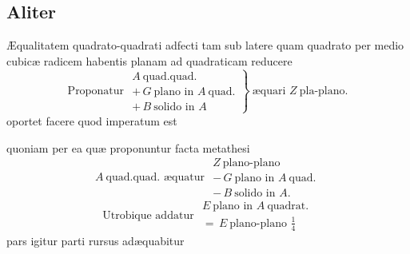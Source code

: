 \documentclass[11pt,a4paper]{article}
\begin{document}
\subsection*{Aliter}

Æqualitatem quadrato-quadrati adfecti tam sub latere quam quadrato per medio cubicæ radicem habentis planam ad quadraticam reducere
\[ \text{Proponatur } \left.\begin{array}{l} A\ \text{quad.quad.} \\ +\,G\ \text{plano in } A\ \text{quad.} \\ +\,B\ \text{solido in } A \end{array}\right\}\ \text{æquari } Z\ \text{pla-plano.} \]
oportet facere quod imperatum est


quoniam per ea quæ proponuntur facta metathesi
\[ A\ \text{quad.quad. æquatur } \begin{array}{l} Z\ \text{plano-plano} \\ -\,G\ \text{plano in } A\ \text{quad.} \\ -\,B\ \text{solido in } A. \end{array} \]
\marginal{$\mp$}
\[ \text{Utrobique addatur } \begin{array}{l} E\ \text{plano in } A\ \text{quadrat.} \\ =\,E\ \text{plano-plano } \frac{1}{4} \end{array} \]
pars igitur parti rursus adæquabitur
\end{document}
